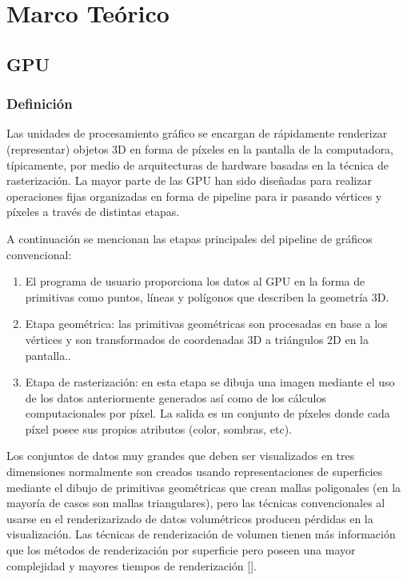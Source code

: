 \chapter{Marco Teórico}%

\section{GPU}
\subsection{Definición}

Las unidades de procesamiento gráfico se encargan de rápidamente renderizar (representar) objetos 3D en forma de píxeles en la pantalla de la computadora, típicamente, por medio de arquitecturas de hardware basadas en la técnica de rasterización. La mayor parte de las GPU han sido diseñadas para realizar operaciones fijas organizadas en forma de pipeline para ir pasando vértices y píxeles a través de distintas etapas.  

A continuación se mencionan las etapas principales del pipeline de gráficos convencional:
\begin{enumerate}

\item El programa de usuario proporciona los datos al GPU en la forma de primitivas como puntos, líneas y polígonos que describen la geometría 3D. 
\item Etapa geométrica: las primitivas geométricas son procesadas en base a los vértices y son transformados de coordenadas 3D a triángulos 2D en la pantalla.. 
\item Etapa de rasterización: en esta etapa se dibuja una imagen mediante el uso de los datos anteriormente generados así como de los cálculos computacionales por píxel. La salida es un conjunto de píxeles donde cada píxel posee sus propios atributos (color, sombras, etc).  

\end{enumerate}

Los conjuntos de datos muy grandes que deben ser visualizados en tres dimensiones normalmente son creados usando representaciones de superficies mediante el dibujo de primitivas geométricas que crean mallas poligonales (en la mayoría de casos son mallas triangulares), pero las técnicas convencionales al usarse en el renderizarizado de datos volumétricos producen pérdidas en la visualización. Las técnicas de  renderización de volumen tienen más información que los métodos de renderización por superficie pero poseen una mayor complejidad y mayores tiempos de renderización [\cite{Akenine2008}].


